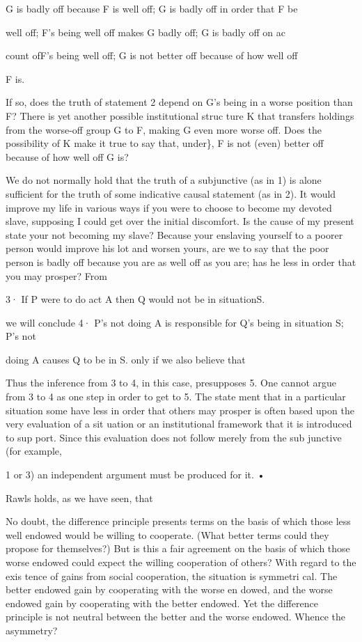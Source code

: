 \documentclass[11pt,openany]{book}
\begin{document}
G is badly off because F is well off; G is badly off in order that F be 

well off; F's being well off makes G badly off; G is badly off on ac

count ofF's being well off; G is not better off because of how well off 

F is. 

If so, does the truth of statement 2 depend on G's being in a worse position than F? There is yet another possible institutional struc ture K that transfers holdings from the worse-off group G to F, making G even more worse off. Does the possibility of K make it true to say that, under\}, F is not (even) better off because of how well off G is? 

We do not normally hold that the truth of a subjunctive (as in 1) is alone sufficient for the truth of some indicative causal statement (as in 2). It would improve my life in various ways if you were to choose to become my devoted slave, supposing I could get over the initial discomfort. Is the cause of my present state your not becoming my slave? Because your enslaving yourself to a poorer person would improve his lot and worsen yours, are we to say that the poor person is badly off because you are as well off as you are; has he less in order that you may prosper? From 

3· If P were to do act A then Q would not be in situationS. 

we will conclude 4· P's not doing A is responsible for Q's being in situation S; P's not 

doing A causes Q to be in S. only if we also believe that 

Thus the inference from 3 to 4, in this case, presupposes 5. One cannot argue from 3 to 4 as one step in order to get to 5. The state ment that in a particular situation some have less in order that others may prosper is often based upon the very evaluation of a sit uation or an institutional framework that it is introduced to sup port. Since this evaluation does not follow merely from the sub junctive (for example, 

1 or 3) an independent argument must be produced for it. • 

Rawls holds, as we have seen, that 

No doubt, the difference principle presents terms on the basis of which those less well endowed would be willing to cooperate. (What better terms could they propose for themselves?) But is this a fair agreement on the basis of which those worse endowed could expect the willing cooperation of others? With regard to the exis tence of gains from social cooperation, the situation is symmetri cal. The better endowed gain by cooperating with the worse en dowed, and the worse endowed gain by cooperating with the better endowed. Yet the difference principle is not neutral between the better and the worse endowed. Whence the asymmetry? 
\end{document}
